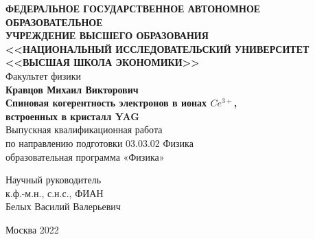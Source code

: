 \documentclass[a4paper,12pt]{article}
\begin{document}

\begin{center}
	\vspace{5ex}
	\textbf{ФЕДЕРАЛЬНОЕ ГОСУДАРСТВЕННОЕ АВТОНОМНОЕ ОБРАЗОВАТЕЛЬНОЕ }\\
	\textbf{ УЧРЕЖДЕНИЕ ВЫСШЕГО ОБРАЗОВАНИЯ }\\
	\textbf{ <<НАЦИОНАЛЬНЫЙ ИССЛЕДОВАТЕЛЬСКИЙ УНИВЕРСИТЕТ }\\
	\textbf{ <<ВЫСШАЯ ШКОЛА ЭКОНОМИКИ>>}\\
	\vspace{5ex}
	Факультет физики\\
	\vspace{5ex}
	\textbf{Кравцов Михаил Викторович}\\
	\vspace{3ex}
	\Large{\textbf{Спиновая когерентность электронов в ионах $Ce^{3+}$,}\\
	\textbf{встроенных в кристалл YAG }}\\
	\vspace{3ex}
	Выпускная квалификационная работа\\
	по направлению подготовки 03.03.02 Физика\\
	образовательная программа «Физика»\\
	\par\end{center}

\vspace{17ex}

\noindent \begin{flushright}
	Научный руководитель\\
	к.ф.-м.н., с.н.с., ФИАН \\
	Белых Василий Валерьевич\\
	
	\par\end{flushright}

\begin{center}
	\vfill{}
	Москва 2022
	\par\end{center}

\thispagestyle{empty}

\newpage
\end{document}
